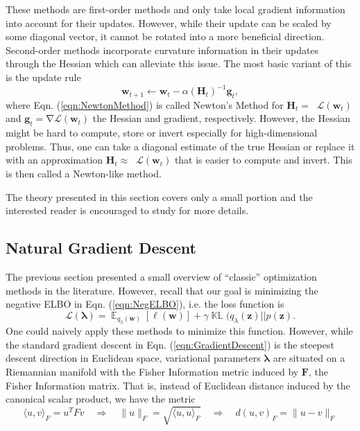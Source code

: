 \documentclass[a4paper, 11pt, oneside]{scrartcl}
\theoremstyle{break}
\DeclareMathOperator{\Expect}{\mathbb{E}}
\DeclareMathOperator{\grad}{\nabla}
\DeclareMathOperator{\Hessian}{\nabla^2}
\DeclareMathOperator{\KL}{\mathbb{KL}}
\newcommand{\matr}[1]{\boldsymbol{#1}}
\newcommand{\set}[1]{\mathcal{#1}}
\numberwithin{equation}{section}
\begin{document}
			These methods are first-order methods and only take local gradient information into account for their updates. 
			However, while their update can be scaled by some diagonal vector, it cannot be rotated into a more beneficial direction.
			Second-order methods incorporate curvature information in their updates through the Hessian which can alleviate this issue.
			The most basic variant of this is the update rule
			\begin{equation}
				\matr{w}_{t+1} \leftarrow \matr{w}_t - \alpha \left( \matr{H}_t \right)^{-1} \matr{g}_t,
				\label{eqn:NewtonMethod}
			\end{equation}
			where Eqn. (\ref{eqn:NewtonMethod}) is called Newton's Method for $\matr{H}_t = \Hessian \mathcal{L} (\matr{w}_t)$ and $\matr{g}_t = \grad \mathcal{L} (\matr{w}_t)$ the Hessian and gradient, respectively. 
			However, the Hessian might be hard to compute, store or invert especially for high-dimensional problems. 
			Thus, one can take a diagonal estimate of the true Hessian or replace it with an approximation $\matr{H}_t \approx \Hessian \mathcal{L} (\matr{w}_t)$ that is easier to compute and invert. 
			This is then called a Newton-like method.
			
			The theory presented in this section covers only a small portion and the interested reader is encouraged to study \parencite{WN99} for more details.

		\subsection{Natural Gradient Descent}
			The previous section presented a small overview of ``classic'' optimization methods in the literature. 
			However, recall that our goal is minimizing the negative ELBO in Eqn. (\ref{eqn:NegELBO}), i.e. the loss function is 
			\begin{equation*}
				\set{L}(\matr{\lambda}) = \Expect_{q_{\lambda}(\matr{w})}[\ell(\matr{w})] + \gamma \KL(q_{\lambda}(\matr{z}) || p(\matr{z}).
			\end{equation*}
			One could naively apply these methods to minimize this function.
			However, while the standard gradient descent in Eqn. (\ref{eqn:GradientDescent}) is the steepest descent direction in Euclidean space, variational parameters $\matr{\lambda}$ are situated on a Riemannian manifold with the Fisher Information metric induced by $\matr{F}$, the Fisher Information matrix. 
			That is, instead of Euclidean distance induced by the canonical scalar product, we have the metric
			\begin{equation*}
				\langle u, v \rangle_F = u^T F v \quad \Rightarrow \quad \|u\|_F = \sqrt{\langle u, u \rangle_F} \quad \Rightarrow \quad d(u, v)_F = \|u - v\|_F
			\end{equation*}			
\end{document}
